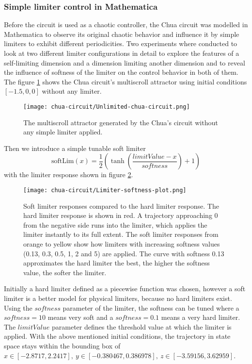 \documentclass[main]{subfiles}
\begin{document}
\subsubsection{Simple limiter control in Mathematica}

Before the circuit is used as a chaotic controller, the Chua circuit was modelled in Mathematica to observe its original chaotic behavior and influence it by simple limiters to exhibit different periodicities. Two experiments where conducted to look at two different limiter configurations in detail to explore the features of a self-limiting dimension and a dimension limiting another dimension and to reveal the influence of softness of the limiter on the control behavior in both of them. The figure \ref{figure:chaoticchuacircuit} shows the Chua circuit's multiscroll attractor using initial conditions \([-1.5,0,0]\) without any limiter.

\begin{figure}[H]
\centering
\texttt{[image: chua-circuit/Unlimited-chua-circuit.png]}
\caption[The multiscroll attractor]{The multiscroll attractor generated by the Chua's circuit without any simple limiter applied.}
\label{figure:chaoticchuacircuit}
\end{figure}

Then we introduce a simple tunable soft limiter \[\text{softLim}(x) = \frac{1}{2} \left(\tanh\left(\frac{limitValue - x}{softness}\right) + 1\right)\] with the limiter response shown in figure \ref{figure:softlimiterresponse}.

\begin{figure}[H]
\centering
\texttt{[image: chua-circuit/Limiter-softness-plot.png]}
\caption[Soft limiter responses]{Soft limiter responses compared to the hard limiter response. The hard limiter response is shown in red. A trajectory approaching 0 from the negative side runs into the limiter, which applies the limiter instantly to its full extent. The soft limiter responses from orange to yellow show how limiters with increasing softness values (0.13, 0.3, 0.5, 1, 2 and 5) are applied. The curve with softness 0.13 approximates the hard limiter the best, the higher the softness value, the softer the limiter.}
\label{figure:softlimiterresponse}
\end{figure}

Initially a hard limiter defined as a piecewise function was chosen, however a soft limiter is a better model for physical limiters, because no hard limiters exist. Using the $softness$ parameter of the limiter, the softness can be tuned where a \(softness = 10\) means very soft and a \(softness = 0.1\) means a very hard limiter. The $limitValue$ parameter defines the threshold value at which the limiter is applied. With the above mentioned initial conditions, the trajectory in state space stays within the bounding box of \(x \in [-2.8717,2.2417],~y \in [-0.380467,0.386978],~z \in [-3.59156,3.62959]\).
\end{document}
